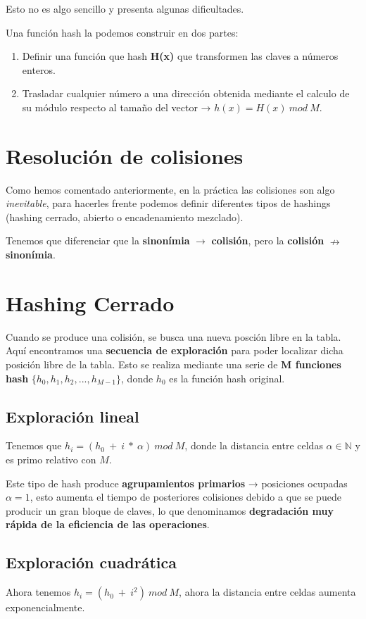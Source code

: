 Esto no es algo sencillo y presenta algunas dificultades.

Una función hash la podemos construir en dos partes:
\begin{enumerate}
  \item Definir una función que hash \textbf{H(x)} que transformen las claves a números enteros.
  \item Trasladar cualquier número a una dirección obtenida mediante el calculo de su módulo respecto al tamaño del vector → \(h(x)= H(x)\ mod\ M\).
\end{enumerate}

\section{Resolución de colisiones}
Como hemos comentado anteriormente, en la práctica las colisiones son algo \textit{inevitable}, para hacerles frente podemos definir diferentes tipos de hashings (hashing cerrado, abierto o encadenamiento mezclado).

Tenemos que diferenciar que la \textbf{sinonímia} \(\rightarrow\) \textbf{colisión}, pero la \textbf{colisión} \(\nrightarrow\) \textbf{sinonímia}.

\section{Hashing Cerrado}
Cuando se produce una colisión, se busca una nueva posción libre en la tabla.
Aquí encontramos una \textbf{secuencia de exploración} para poder localizar dicha posición libre de la tabla.
Esto se realiza mediante una serie de \textbf{M funciones hash} \(\{h_{0},h_{1},h_{2},...,h_{M-1}\}\), donde \(h_{0}\) es la función hash original.

\subsection*{Exploración lineal}
Tenemos que \(h_i = (h_0\ +\ i\ *\ \alpha) \ mod\ M\), donde la distancia entre celdas \(\alpha \in \mathbb{N}\)  y es primo relativo con \(M\).

Este tipo de hash produce \textbf{agrupamientos primarios} → posiciones ocupadas \(\alpha = 1\), esto aumenta el tiempo de posteriores colisiones debido a que se puede producir un gran bloque de claves, lo que denominamos \textbf{degradación muy rápida de la eficiencia de las operaciones}. 

\subsection*{Exploración cuadrática}
Ahora tenemos \(h_i = (h_0\ +\ i^2)\ mod\ M\), ahora la distancia entre celdas aumenta exponencialmente.

